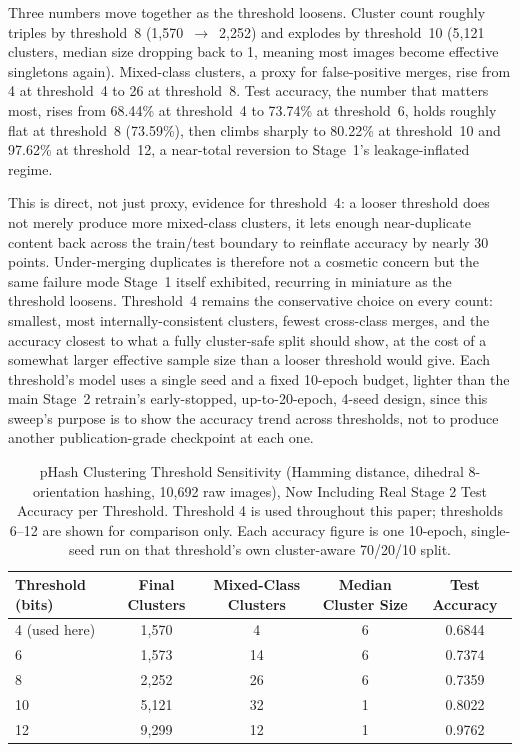Three numbers move together as the threshold loosens. Cluster count roughly triples by threshold~8 (1,570~$\rightarrow$~2,252) and explodes by threshold~10 (5,121 clusters, median size dropping back to 1, meaning most images become effective singletons again). Mixed-class clusters, a proxy for false-positive merges, rise from 4 at threshold~4 to 26 at threshold~8. Test accuracy, the number that matters most, rises from 68.44\% at threshold~4 to 73.74\% at threshold~6, holds roughly flat at threshold~8 (73.59\%), then climbs sharply to 80.22\% at threshold~10 and 97.62\% at threshold~12, a near-total reversion to Stage~1's leakage-inflated regime.

This is direct, not just proxy, evidence for threshold~4: a looser threshold does not merely produce more mixed-class clusters, it lets enough near-duplicate content back across the train/test boundary to reinflate accuracy by nearly 30 points. Under-merging duplicates is therefore not a cosmetic concern but the same failure mode Stage~1 itself exhibited, recurring in miniature as the threshold loosens. Threshold~4 remains the conservative choice on every count: smallest, most internally-consistent clusters, fewest cross-class merges, and the accuracy closest to what a fully cluster-safe split should show, at the cost of a somewhat larger effective sample size than a looser threshold would give. Each threshold's model uses a single seed and a fixed 10-epoch budget, lighter than the main Stage~2 retrain's early-stopped, up-to-20-epoch, 4-seed design, since this sweep's purpose is to show the accuracy trend across thresholds, not to produce another publication-grade checkpoint at each one.

\begin{table}[!ht]
\centering
\caption{pHash Clustering Threshold Sensitivity (Hamming distance, dihedral 8-orientation hashing, 10,692 raw images), Now Including Real Stage 2 Test Accuracy per Threshold. Threshold 4 is used throughout this paper; thresholds 6--12 are shown for comparison only. Each accuracy figure is one 10-epoch, single-seed run on that threshold's own cluster-aware 70/20/10 split.}
\label{tbl:phash-sweep}
\begin{tabular}{lcccc}
\toprule
Threshold (bits) & Final Clusters & Mixed-Class Clusters & Median Cluster Size & Test Accuracy \\
\midrule
4 (used here) & 1,570 & 4 & 6 & 0.6844 \\
6 & 1,573 & 14 & 6 & 0.7374 \\
8 & 2,252 & 26 & 6 & 0.7359 \\
10 & 5,121 & 32 & 1 & 0.8022 \\
12 & 9,299 & 12 & 1 & 0.9762 \\
\bottomrule
\end{tabular}
\end{table}

